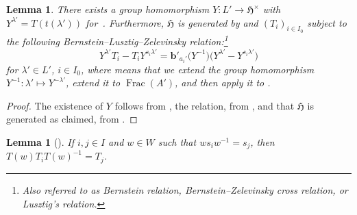\documentclass[10pt,a4paper]{amsart}
\newtheorem{Lemma}[Theorem]{Lemma}
\theoremstyle{definition}
\numberwithin{equation}{section}
\begin{document}
\begin{Lemma}\label{sec:lem-bernstein}
 There exists a group homomorphism $Y\colon L'\!\to\!\mathfrak{H}^\times$ with
 $Y^{\lambda'}\! = T(t(\lambda'))$ for~. Furthermore,
 $\mathfrak{H}$ is generated by  and $(T_i)_{i\in I_0}$ subject to the
 following Bernstein--Lusztig--Zelevinsky relation:\footnote{Also referred to as Bernstein relation, Bernstein--Zelevinsky cross relation, or Lusztig's relation.}
 \begin{equation}\label{eq:y-bernstein}
 Y^{\lambda'} T_i - T_i Y^{s_i\lambda'} = \bm{b}'_{a_i'}\bigl(Y^{-1}\bigr)
 \bigl(Y^{\lambda'} - Y^{s_i\lambda'}\bigr)
 \end{equation}
 for $\lambda'\in L'$, $i\in I_0$,
 where  means that we extend the group homomorphism
 $Y^{-1}\colon \lambda'\mapsto Y^{-\lambda'}$, extend it to $\operatorname{Frac}(A')$, and then apply it to .
\end{Lemma}
\begin{proof}
 The existence of $Y$ follows from \cite[equation~(3.2.2)]{macdonald}, the
 relation, from \cite[Section~4.2.4]{macdonald}, and that $\mathfrak{H}$ is
 generated as claimed, from \cite[Section~4.2.7]{macdonald}.
\end{proof}

\begin{Lemma}[{\cite[Section~3.1.8]{macdonald}}]\label{sec:permute-simple-reflections}
 If $i,j\in I$ and $w\in W$ such that
 $ws_iw^{-1} = s_j$, then
$
 T(w)T_iT(w)^{-1} = T_j$.
\end{Lemma}
\end{document}
